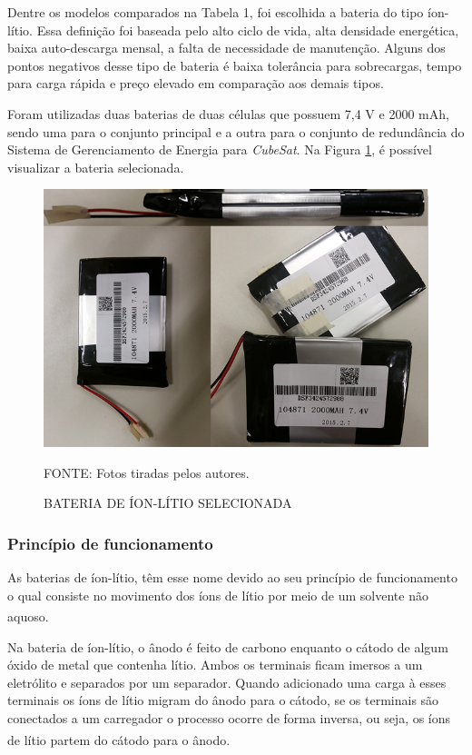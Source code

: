 \documentclass[
	12pt,				%
	openright,			%
	oneside,			%
	a4paper,			%
	english,			%
	french,				%
	spanish,			%
	brazil,				%
	oldfontcommands
	]{abntex2}
\begin{document}
	Dentre os modelos comparados na Tabela 1, foi escolhida a bateria do tipo íon-lítio. Essa definição foi baseada pelo alto ciclo de vida, alta densidade energética, baixa auto-descarga mensal, a falta de necessidade de manutenção. Alguns dos pontos negativos desse tipo de bateria é baixa tolerância para sobrecargas, tempo para carga rápida e preço elevado em comparação aos demais tipos.
	
	Foram utilizadas duas baterias de duas células que possuem 7,4 V e 2000 mAh, sendo uma para o conjunto principal e a outra para o conjunto de redundância do Sistema de Gerenciamento de Energia para \textit{CubeSat}. Na Figura \ref{Fig_Bat_Sel}, é possível visualizar a bateria selecionada.
	
	\begin{figure}[th]
		\caption{BATERIA DE ÍON-LÍTIO SELECIONADA}
		\label{Fig_Bat_Sel}
		\centering
		\includegraphics[width=0.8\linewidth]{./figs/cubesat_04}
			
		\begin{small}
			FONTE: Fotos tiradas pelos autores.
		\end{small}
	\end{figure}
	
\subsubsection[Princípio de funcionamento]{Princípio de funcionamento}
	
	As baterias de íon-lítio, têm esse nome devido ao seu princípio de funcionamento o qual consiste no movimento dos íons de lítio por meio de um solvente não aquoso.\textsuperscript{\cite{BraEsc}}	
	
	Na bateria de íon-lítio, o ânodo é feito de carbono enquanto o cátodo de algum óxido de metal que contenha lítio. Ambos os terminais ficam imersos a um eletrólito e separados por um separador. Quando adicionado uma carga à esses terminais os íons de lítio migram do ânodo para o cátodo, se os terminais são conectados a um carregador o processo ocorre de forma inversa,  ou seja, os íons de lítio partem do cátodo para o ânodo.\textsuperscript{\cite{sony}}
	
\end{document}
